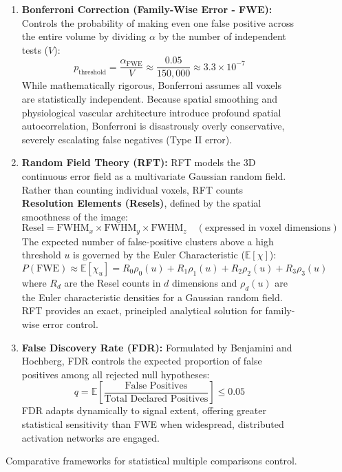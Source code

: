 \documentclass[11pt,a4paper]{article}
\begin{document}
\begin{figure}[htbp]
\centering
\begin{tcolorbox}[colback=teal!5!white,colframe=teal!60!black,title=\textbf{Methodologies for Multiple Comparisons Correction in fMRI},width=\linewidth]
\small
\begin{enumerate}[leftmargin=1.5em]
    \item \textbf{Bonferroni Correction (Family-Wise Error - FWE):} Controls the probability of making even one false positive across the entire volume by dividing $\alpha$ by the number of independent tests ($V$):
    \begin{equation}
        p_{\text{threshold}} = \frac{\alpha_{\text{FWE}}}{V} \approx \frac{0.05}{150,000} \approx 3.3 \times 10^{-7}
    \end{equation}
    While mathematically rigorous, Bonferroni assumes all voxels are statistically independent. Because spatial smoothing and physiological vascular architecture introduce profound spatial autocorrelation, Bonferroni is disastrously overly conservative, severely escalating false negatives (Type II error).
    \item \textbf{Random Field Theory (RFT):} RFT models the 3D continuous error field as a multivariate Gaussian random field. Rather than counting individual voxels, RFT counts \textbf{Resolution Elements (Resels)}, defined by the spatial smoothness of the image:
    \begin{equation}
        \text{Resel} = \text{FWHM}_x \times \text{FWHM}_y \times \text{FWHM}_z \quad (\text{expressed in voxel dimensions})
    \end{equation}
    The expected number of false-positive clusters above a high threshold $u$ is governed by the Euler Characteristic ($\mathbb{E}[\chi]$):
    \begin{equation}
        P(\text{FWE}) \approx \mathbb{E}[\chi_u] = R_0 \rho_0(u) + R_1 \rho_1(u) + R_2 \rho_2(u) + R_3 \rho_3(u)
    \end{equation}
    where $R_d$ are the Resel counts in $d$ dimensions and $\rho_d(u)$ are the Euler characteristic densities for a Gaussian random field. RFT provides an exact, principled analytical solution for family-wise error control.
    \item \textbf{False Discovery Rate (FDR):} Formulated by Benjamini and Hochberg, FDR controls the expected proportion of false positives among all rejected null hypotheses:
    \begin{equation}
        q = \mathbb{E}\left[ \frac{\text{False Positives}}{\text{Total Declared Positives}} \right] \le 0.05
    \end{equation}
    FDR adapts dynamically to signal extent, offering greater statistical sensitivity than FWE when widespread, distributed activation networks are engaged.
\end{enumerate}
\end{tcolorbox}
\caption{Comparative frameworks for statistical multiple comparisons control.}
\label{fig:multiple_comparisons}
\end{figure}
\end{document}
